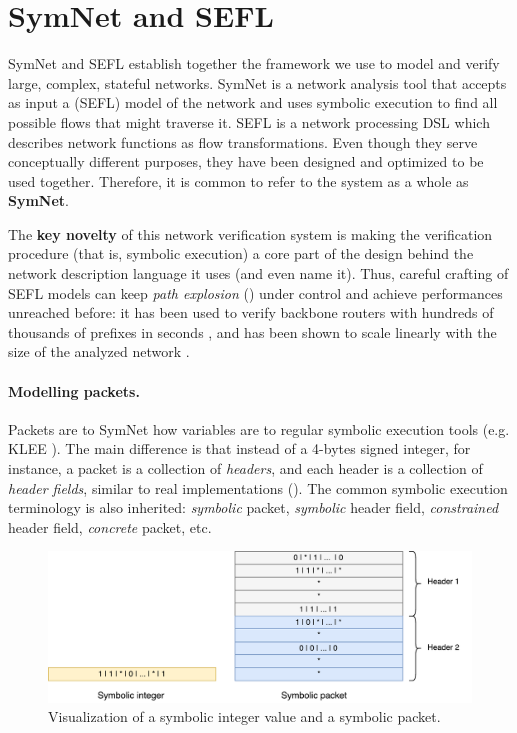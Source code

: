\section{SymNet and SEFL}\label{sec:symnet-sefl}

SymNet and SEFL establish together the framework we use to model and verify
large, complex, stateful networks. SymNet is a network analysis tool that
accepts as input a (SEFL) model of the network and uses symbolic execution to
find all possible flows that might traverse it.  SEFL is a network processing
DSL which describes network functions as flow transformations.  Even though
they serve conceptually different purposes, they have been designed and
optimized to be used together.  Therefore, it is common to refer to the system
as a whole as \textbf{SymNet}.

The \textbf{key novelty} of this network verification system is making the
verification procedure (that is, symbolic execution) a core part of the design
behind the network description language it uses (and even name it).  Thus,
careful crafting of SEFL models can keep \emph{path explosion}
() under control and achieve
performances unreached before: it has been used to verify backbone routers with
hundreds of thousands of prefixes in seconds \cite{stoenescu2016symnet}, and
has been shown to scale linearly with the size of the analyzed network
\cite{stoenescu2013symnet}.

\paragraph{Modelling packets.}
Packets are to SymNet how variables are to regular symbolic execution tools
(e.g. KLEE \cite{cadar2008klee}). The main difference is that instead of a
4-bytes signed integer, for instance, a packet is a collection of
\emph{headers}, and each header is a collection of \emph{header fields},
similar to real implementations ().
The common symbolic execution terminology is also inherited: \emph{symbolic}
packet, \emph{symbolic} header field, \emph{constrained} header field,
\emph{concrete} packet, etc.

\begin{figure}[h]
  \centering
  \includegraphics[scale=0.6]{src/img/symbolic-packet}
  \caption{Visualization of a symbolic integer value and a symbolic packet.}
  \label{fig:symbolic-packet}
\end{figure}


